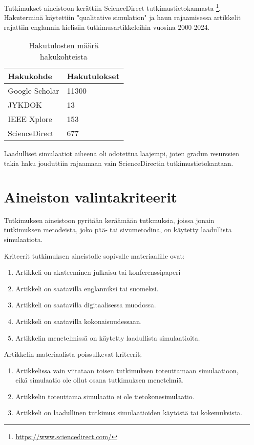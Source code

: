\documentclass[utf8]{gradu3}
\begin{document}
Tutkimukset aineistoon kerättiin ScienceDirect-tutkimustietokannasta \footnote{\url{https://www.sciencedirect.com/}}. Hakuterminä käytettiin "qualitative simulation" ja haun rajaamisessa artikkelit rajattiin englannin kielisiin tutkimusartikkeleihin vuosina 2000-2024. 

\begin{table}[h]
\centering
\begin{tabular}{|l|l|}
\hline
\textbf{Hakukohde} & \textbf{Hakutulokset} \\ \hline
Google Scholar     & 11300                 \\ \hline
JYKDOK             & 13                    \\ \hline
IEEE Xplore        & 153                   \\ \hline
ScienceDirect      & 677                   \\ \hline
\end{tabular}
\caption{Hakutulosten määrä hakukohteista}
\label{table: hakutulokset}
\end{table}

Laadulliset simulaatiot aiheena oli odotettua laajempi, 
joten gradun resurssien takia haku jouduttiin rajaamaan 
vain ScienceDirectin tutkimustietokantaan.

\section{Aineiston valintakriteerit} \label{valintakriteerit}
Tutkimuksen aineistoon pyritään keräämään tutkmuksia, joissa jonain tutkimuksen metodeista, joko pää- tai sivumetodina, on käytetty laadullista simulaatiota.

Kriteerit tutkimuksen aineistolle sopivalle materiaalille ovat:
\begin{enumerate}
    \item Artikkeli on akateeminen julkaisu tai konferenssipaperi
    \item Artikkeli on saatavilla englanniksi tai suomeksi.
    \item Artikkeli on saatavilla digitaalisessa muodossa.
    \item Artikkeli on saatavilla kokonaisuudessaan.
    \item Artikkelin menetelmissä on käytetty laadullista simulaatioita.
\end{enumerate}

Artikkelin materiaalista poissulkevat kriteerit;
\begin{enumerate}
    \item Artikkelissa vain viitataan toisen tutkimuksen toteuttamaan simulaatioon, eikä simulaatio ole ollut osana tutkimuksen menetelmiä.
    \item Artikkelin toteuttama simulaatio ei ole tietokonesimulaatio.
    \item Artikkeli on laadullinen tutkimus simulaatioiden käytöstä tai kokemuksista.
\end{enumerate}
\end{document}
